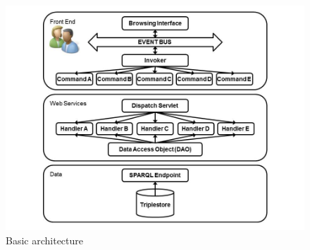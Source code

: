 \begin{figure}[!hbt]
\centering
\includegraphics[scale=0.3]{img/APAarchitecture.jpg}
\caption{Basic architecture}
\label{fig:arch}
\end{figure}

